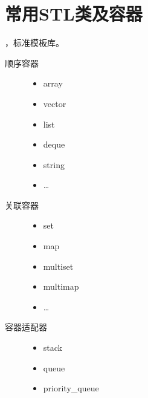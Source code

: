 \documentclass[letterpaper,10pt,english]{sphinxmanual}
\begin{document}
\section{常用STL类及容器}
\label{\detokenize{cpp/19_stl:stl}}\label{\detokenize{cpp/19_stl::doc}}
 ，标准模板库。
\begin{description}
\item[{顺序容器}] \leavevmode\begin{itemize}
\item {} 
array

\item {} 
vector

\item {} 
list

\item {} 
deque

\item {} 
string

\item {} 
…

\end{itemize}

\item[{关联容器}] \leavevmode\begin{itemize}
\item {} 
set

\item {} 
map

\item {} 
multiset

\item {} 
multimap

\item {} 
…

\end{itemize}

\item[{容器适配器}] \leavevmode\begin{itemize}
\item {} 
stack

\item {} 
queue

\item {} 
priority\_queue

\end{itemize}

\end{description}
\end{document}
